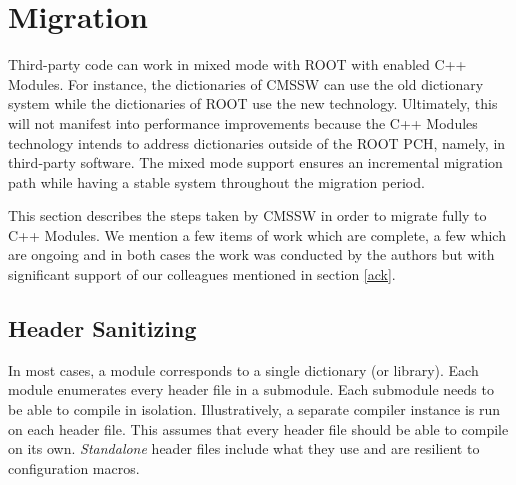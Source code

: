\documentclass[12pt]{iopart}
\begin{document}


\section{Migration}
\label{migration}

Third-party code can work in mixed mode with ROOT with enabled C++ Modules. For instance, the dictionaries of CMSSW can use the old dictionary system while the dictionaries of ROOT use the new technology. Ultimately, this will not manifest into performance improvements because the C++ Modules technology intends to address dictionaries outside of the ROOT PCH, namely, in third-party software. The mixed mode support ensures an incremental migration path while having a stable system throughout the migration period. 

This section describes the steps taken by CMSSW in order to migrate fully to C++ Modules. We mention a few items of work which are complete, a few which are ongoing and in both cases the work was conducted by the authors but with significant support of our colleagues mentioned in section \ref{ack}.

\subsection{Header Sanitizing}
In most cases, a module corresponds to a single dictionary (or library). Each module enumerates every header file in a submodule. Each submodule needs to be able to compile in isolation. Illustratively, a separate compiler instance is run on each header file. This assumes that every header file should be able to compile on its own. \textit{Standalone} header files include what they use and are resilient to configuration macros.
\end{document}
